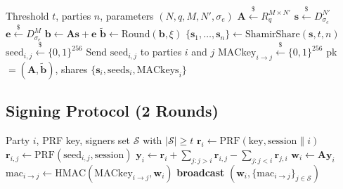 \documentclass[11pt,a4paper]{article}
\begin{document}
\begin{algorithm}[H]
\caption{Ringtail Key Generation}
\label{alg:keygen}
\begin{algorithmic}[1]
\Require Threshold $t$, parties $n$, parameters $(N, q, M, N', \sigma_e)$
\State $\mathbf{A} \stackrel{\$}{\leftarrow} R_q^{M \times N'}$ 
\State $\mathbf{s} \stackrel{\$}{\leftarrow} D_{\sigma_e}^{N'}$ 
\State $\mathbf{e} \stackrel{\$}{\leftarrow} D_{\sigma_e}^{M}$ 
\State $\mathbf{b} \gets \mathbf{A}\mathbf{s} + \mathbf{e}$ 
\State $\tilde{\mathbf{b}} \gets \text{Round}(\mathbf{b}, \xi)$ 
\State $\{\mathbf{s}_1, \ldots, \mathbf{s}_n\} \gets \text{ShamirShare}(\mathbf{s}, t, n)$ 
\State {}
    \State $\text{seed}_{i,j} \stackrel{\$}{\leftarrow} \{0,1\}^{256}$ 
    \State Send $\text{seed}_{i,j}$ to parties $i$ and $j$
\EndFor
\State {}
    \State $\text{MACkey}_{i \to j} \stackrel{\$}{\leftarrow} \{0,1\}^{256}$
\EndFor
\State \Return pk $= (\mathbf{A}, \tilde{\mathbf{b}})$, shares $\{\mathbf{s}_i, \text{seeds}_i, \text{MACkeys}_i\}$
\end{algorithmic}
\end{algorithm}

\subsection{Signing Protocol (2 Rounds)}

\begin{algorithm}[H]
\caption{Ringtail Signing --- Round 1 (Message-Independent)}
\label{alg:sign-r1}
\begin{algorithmic}[1]
\Require Party $i$, PRF key, signers set $\mathcal{S}$ with $|\mathcal{S}| \geq t$
\State {}
\State $\mathbf{r}_i \gets \text{PRF}(\text{key}, \text{session} \| i)$ 
    \State $\mathbf{r}_{i,j} \gets \text{PRF}(\text{seed}_{i,j}, \text{session})$ 
\EndFor
\State $\mathbf{y}_i \gets \mathbf{r}_i + \sum_{j : j > i} \mathbf{r}_{i,j} - \sum_{j : j < i} \mathbf{r}_{j,i}$
\State $\mathbf{w}_i \gets \mathbf{A} \mathbf{y}_i$ 
\State {}
    \State $\text{mac}_{i \to j} \gets \text{HMAC}(\text{MACkey}_{i \to j}, \mathbf{w}_i)$
\EndFor
\State \textbf{broadcast} $(\mathbf{w}_i, \{\text{mac}_{i \to j}\}_{j \in \mathcal{S}})$
\end{algorithmic}
\end{algorithm}
\end{document}
